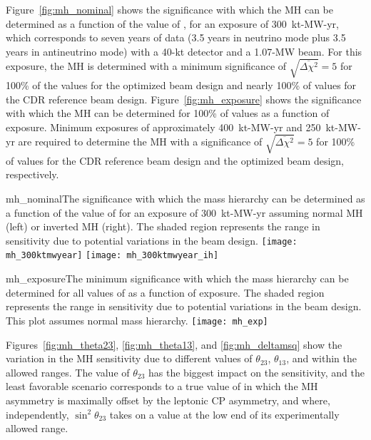 Figure~\ref{fig:mh_nominal} shows the significance with which the MH can be determined as a function of the value of \deltacp, for an exposure of 300~kt-MW-yr, which corresponds to seven years of data (3.5 years in neutrino mode plus 3.5 years in antineutrino mode) with a 40-kt detector and a 1.07-MW beam.  For this exposure, the MH is determined with a minimum significance of $\sqrt{\overline{\Delta\chi^{2}}} = 5$ for 100\% of the \deltacp values for the optimized beam design and nearly 100\% of \deltacp values for the CDR reference beam design.  Figure~\ref{fig:mh_exposure} shows the significance with which the MH can be determined for 100\% of \deltacp values as a function of exposure.  Minimum exposures of approximately 400~kt-MW-yr and 250~kt-MW-yr are required to determine the MH with a significance of $\sqrt{\overline{\Delta\chi^2}} = 5$ for 100\% of \deltacp values for the CDR reference beam design and the optimized beam design, respectively.

\begin{cdrfigure}{mh_nominal}{The significance with which the mass hierarchy can be determined as a function of the value of \deltacp for an exposure of 300~kt-MW-yr assuming normal MH (left) or inverted MH (right).  The shaded region represents the range in sensitivity due to potential variations in the beam design.}
 \texttt{[image: mh\_300ktmwyear]}
 \texttt{[image: mh\_300ktmwyear\_ih]}
\end{cdrfigure}

\begin{cdrfigure}{mh_exposure}{The minimum significance with which the mass hierarchy can be determined for all values of \deltacp as a function of exposure.  The shaded region represents the range in sensitivity due to potential variations in the beam design. This plot assumes normal mass hierarchy.}
 \texttt{[image: mh\_exp]}
\end{cdrfigure}

Figures~\ref{fig:mh_theta23}, \ref{fig:mh_theta13}, and \ref{fig:mh_deltamsq} show the variation in the MH sensitivity due to different values of $\theta_{23}$, $\theta_{13}$, and  within the allowed ranges.  The value of $\theta_{23}$ has the biggest impact on the sensitivity, and the least favorable scenario corresponds to a true value of \deltacp in which the MH asymmetry
is maximally offset by the leptonic CP asymmetry, and where, independently, 
$\sin^2{\theta_{23}}$ takes on a value at the low end of its 
experimentally allowed range.

